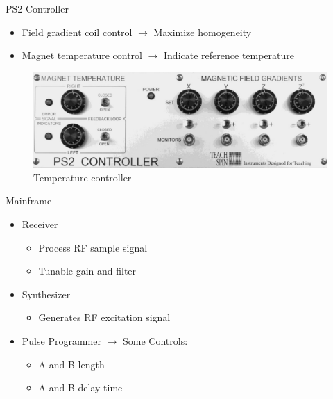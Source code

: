 \documentclass[aspectratio=169,xcolor=dvipsnames]{beamer}
\begin{document}
\begin{frame}{PS2 Controller}
    \begin{itemize}
        \item Field gradient coil control $\rightarrow$ Maximize homogeneity
        \item Magnet temperature control $\rightarrow$ Indicate reference temperature 
    \end{itemize}
    \begin{figure}
        \includegraphics[width = 0.6\linewidth]{figs/temp-controller.png}
        \caption{Temperature controller}
    \end{figure}
\end{frame}

\begin{frame}{Mainframe}
    \begin{itemize}
        \item Receiver
        \begin{itemize}
            \item Process RF sample signal 
            \item Tunable gain and filter
        \end{itemize}
        \item Synthesizer
        \begin{itemize}
            \item Generates RF excitation signal 
        \end{itemize}
        \item Pulse Programmer $\rightarrow$ Some Controls: 
        \begin{itemize}
            \item A and B length
            \item A and B delay time
        \end{itemize} 
    \end{itemize}
\end{frame}
\end{document}
